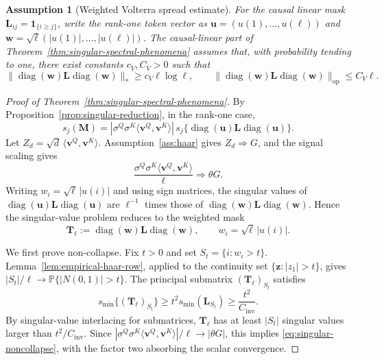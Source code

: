 \documentclass{article}
\newcommand{\Prob}{\mathbb{P}}
\newcommand{\diag}{\operatorname{diag}}
\newcommand{\op}{\operatorname{op}}
\newcommand{\weak}{\Rightarrow}
\newcommand{\one}{\mathbf{1}}
\newcommand{\bM}{\mathbf{M}}
\newcommand{\bL}{\mathbf{L}}
\newcommand{\bT}{\mathbf{T}}
\newcommand{\bu}{\mathbf{u}}
\newcommand{\bv}{\mathbf{v}}
\newcommand{\bw}{\mathbf{w}}
\newtheorem{assumption}[theorem]{Assumption}
\theoremstyle{remark}
\begin{document}
\begin{assumption}[Weighted Volterra spread estimate]
For the causal linear mask $\bL_{ij}=\one_{\{i\geq j\}}$, write the rank-one
token vector as $\bu=(u(1),\ldots,u(\ell))$ and
$\bw=\sqrt\ell(|u(1)|,\ldots,|u(\ell)|)$.  The causal-linear part of
Theorem~\ref{thm:singular-spectral-phenomena} assumes that, with probability
tending to one, there exist constants $c_V,C_V>0$ such that
\begin{equation}
    \|\diag(\bw)\bL\diag(\bw)\|_*
    \geq c_V\ell\log\ell,
    \qquad
    \|\diag(\bw)\bL\diag(\bw)\|_{\op}
    \leq C_V\ell .
    \label{eq:weighted-volterra-spread}
\end{equation}
\label{ass:weighted-volterra-spread}
\end{assumption}

\begin{proof}[Proof of Theorem~\ref{thm:singular-spectral-phenomena}]
By Proposition~\ref{prop:singular-reduction}, in the rank-one case,
\[
    s_j(\bM)
    =
    |\sigma^Q\sigma^K\langle\bv^Q,\bv^K\rangle|\,
    s_j\{\diag(\bu)\bL\diag(\bu)\}.
\]
Let $Z_d=\sqrt d\,\langle\bv^Q,\bv^K\rangle$.  Assumption~\ref{ass:haar} gives
$Z_d\weak G$, and the signal scaling gives
\[
    \frac{\sigma^Q\sigma^K\langle\bv^Q,\bv^K\rangle}{\ell}
    \weak
    \theta G.
\]
Writing $w_i=\sqrt\ell\,|u(i)|$ and using sign matrices, the singular values of
$\diag(\bu)\bL\diag(\bu)$ are $\ell^{-1}$ times those of
$\diag(\bw)\bL\diag(\bw)$.  Hence the singular-value problem reduces to the
weighted mask
\[
    \bT_\ell:=\diag(\bw)\bL\diag(\bw),
    \qquad
    w_i=\sqrt\ell\,|u(i)|.
\]

We first prove non-collapse.  Fix $t>0$ and set
$S_t=\{i:w_i>t\}$.  Lemma~\ref{lem:empirical-haar-row}, applied to the
continuity set $\{\mathbf z:|z_1|>t\}$, gives
$|S_t|/\ell\to\Prob\{|N(0,1)|>t\}$.  The principal submatrix
$(\bT_\ell)_{S_t}$ satisfies
\[
    s_{\min}\{(\bT_\ell)_{S_t}\}
    \geq
    t^2s_{\min}(\bL_{S_t})
    \geq
    \frac{t^2}{C_{\mathrm{inv}}}.
\]
By singular-value interlacing for submatrices, $\bT_\ell$ has at least
$|S_t|$ singular values larger than $t^2/C_{\mathrm{inv}}$.  Since
$|\sigma^Q\sigma^K\langle\bv^Q,\bv^K\rangle|/\ell\to|\theta G|$, this implies
\eqref{eq:singular-noncollapse}, with the factor two absorbing the scalar
convergence.


\end{proof}
\end{document}
